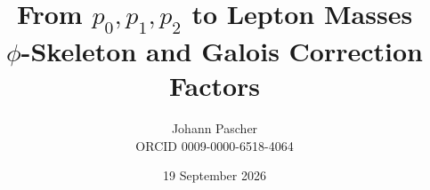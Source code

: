 \documentclass[11pt,a4paper]{report}
\title{From $p_0,p_1,p_2$ to Lepton Masses\\[0.5em]\large $\phi$-Skeleton and Galois Correction Factors}
\date{19 September 2026}
\author{Johann Pascher\\\small ORCID 0009-0000-6518-4064}
\begin{document}
\renewcommand{\thechapter}{}
\renewcommand{\thesection}{\arabic{section}}
\maketitle
\tableofcontents

\end{document}
